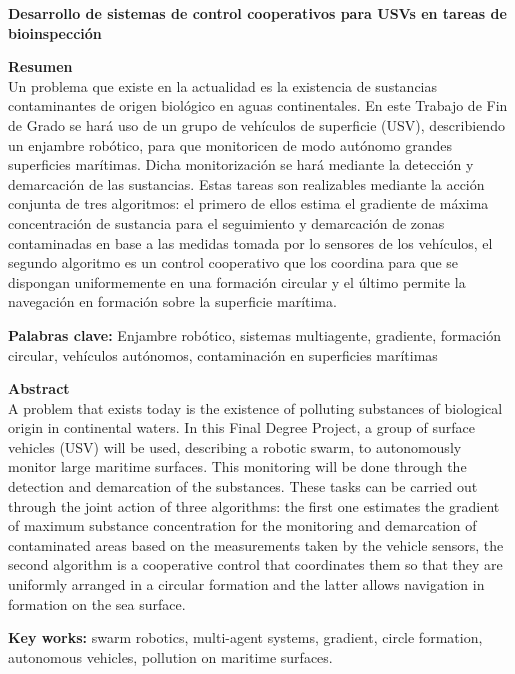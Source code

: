 
\newpage

\thispagestyle{empty}
\setlength{\parindent}{0cm}

{\bf \large Desarrollo de sistemas de control cooperativos para USVs en tareas de bioinspección}
\vspace{0.15cm}

{\bf \large Resumen}\\
Un problema que existe en la actualidad es la existencia de sustancias contaminantes de origen biológico en aguas continentales. En este Trabajo de Fin de Grado se hará uso  de un grupo de vehículos de superficie (USV), describiendo un enjambre robótico, para que monitoricen de modo autónomo grandes superficies marítimas. Dicha monitorización se hará mediante la detección y demarcación de las sustancias. Estas tareas son realizables mediante la acción conjunta de tres algoritmos: el primero de ellos estima el gradiente de máxima concentración de sustancia para el seguimiento y demarcación de zonas contaminadas en base a las medidas tomada por lo sensores de los vehículos, el segundo algoritmo es un control cooperativo que los coordina para que se dispongan uniformemente en una formación circular y el último permite la navegación en formación sobre la superficie marítima.

\vspace{0.15cm}


{\bf Palabras clave:} Enjambre robótico, sistemas multiagente, gradiente, formación circular, vehículos autónomos, contaminación en superficies marítimas
\vspace{0.15cm}

{\bf \large Abstract}\\
A problem that exists today is the existence of polluting substances of biological origin in continental waters. In this Final Degree Project, a group of surface vehicles (USV) will be used, describing a robotic swarm, to autonomously monitor large maritime surfaces. This monitoring will be done through the detection and demarcation of the substances. These tasks can be carried out through the joint action of three algorithms: the first one estimates the gradient of maximum substance concentration for the monitoring and demarcation of contaminated areas based on the measurements taken by the vehicle sensors, the second algorithm is a cooperative control that coordinates them so that they are uniformly arranged in a circular formation and the latter allows navigation in formation on the sea surface.

\vspace{0.15cm}

{\bf Key works:} swarm robotics, multi-agent systems, gradient, circle formation, autonomous vehicles, pollution on maritime surfaces. 
